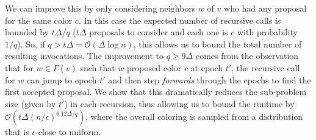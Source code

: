 We can improve this by only considering neighbors $w$ of $v$ who had any proposal for the same color $c$.
In this case the expected number of recursive calls is bounded by $t\Delta/q$
($t\Delta$ proposals to consider and each one is $c$ with probability $1/q$).
So, if $q > t\Delta = \mathcal O(\Delta\log n)$, this allows us to bound the total number of resulting invocations.
The improvement to $q\ge 9\Delta$ comes from the observation that for $w\in\Gamma(v)$ such that $w$ proposed color $c$ at epoch $t'$,
the recursive call for $w$ can jump to epoch $t'$ and then step \emph{forwards} through the epochs to find the first accepted proposal.
We show that this dramatically reduces the sub-problem size (given by $t'$) in each recursion,
thus allowing us to bound the runtime by $\mathcal O\left(t\Delta (n/\epsilon)^{6.12\Delta/q}\right)$,
where the overall coloring is sampled from a distribution that is $\epsilon$-close to uniform.
